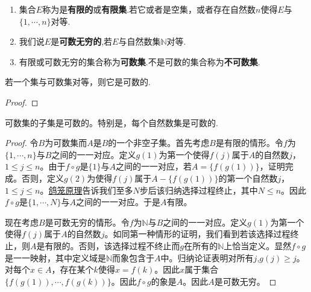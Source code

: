 \documentclass[lang=cn,newtx,10pt,scheme=chinese]{../Template/elegantbook}
\begin{document}
\begin{definition}[可数集与不可数集]\label{definition:可数集与不可数集}
\begin{enumerate}
  \item 集合\(E\)称为是\textbf{有限的}或\textbf{有限集}.若它或者是空集，或者存在自然数\(n\)使得\(E\)与\(\{1, \cdots, n\}\)对等.
  \item 我们说\(E\)是\textbf{可数无穷的},若\(E\)与自然数集\(\mathbb{N}\)对等.
  \item 有限或可数无穷的集合称为\textbf{可数集}.不是可数的集合称为\textbf{不可数集}.
\end{enumerate}
\end{definition}

\begin{proposition}\label{proposition:与可数集对等的集合是可数集}
  若一个集与可数集对等，则它是可数的.
\end{proposition}
\begin{proof}
  

\end{proof}

\begin{theorem}\label{theorem:可数集的子集是可数的}
  可数集的子集是可数的。特别是，每个自然数集是可数的.
\end{theorem}
\begin{proof}
  令\(B\)为可数集而\(A\)是\(B\)的一个非空子集。首先考虑\(B\)是有限的情形。令\(f\)为\(\{1, \cdots, n\}\)与\(B\)之间的一一对应。定义\(g(1)\)为第一个使得\(f(j)\)属于\(A\)的自然数\(j\)，\(1\leqslant j\leqslant n\)。由于\(f\circ g\)是\(\{1\}\)与\(A\)之间的一一对应，若\(A = \{f(g(1))\}\)，证明完成。否则，定义\(g(2)\)为使得\(f(j)\)属于\(A-\{f(g(1))\}\)的第一个自然数\(j\)，\(1\leqslant j\leqslant n\)。\hyperref[theorem:鸽笼原理]{鸽笼原理}告诉我们至多\(N\)步后该归纳选择过程终止，其中\(N\leqslant n\)。因此\(f\circ g\)是\(\{1, \cdots, N\}\)与\(A\)之间的一一对应。于是\(A\)有限。

现在考虑\(B\)是可数无穷的情形。令\(f\)为\(\mathbb{N}\)与\(B\)之间的一一对应。定义\(g(1)\)为第一个使得\(f(j)\)属于\(A\)的自然数\(j\)。如同第一种情形的证明，我们看到若该选择过程终止，则\(A\)是有限的。否则，该选择过程不终止而\(g\)在所有的\(\mathbb{N}\)上恰当定义。显然\(f\circ g\)是一一映射，其中定义域是\(\mathbb{N}\)而象包含于\(A\)中。归纳论证表明对所有\(j\),\(g(j)\geqslant j\)。对每个\(x\in A\)，存在某个\(k\)使得\(x = f(k)\)。因此\(x\)属于集合\(\{f(g(1)), \cdots, f(g(k))\}\)。因此\(f\circ g\)的象是\(A\)。因此\(A\)是可数无穷。

\end{proof}
\end{document}
